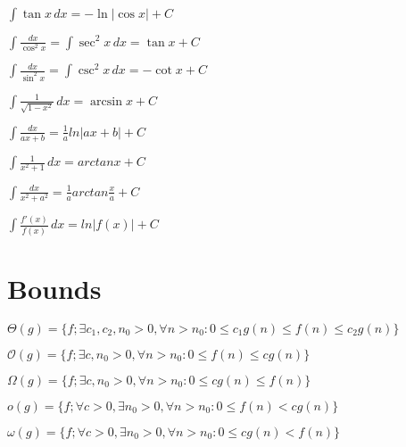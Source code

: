 \documentclass{article}
\begin{document}
\begin{multicols*}{2}
{\begin{center}
\begin{small}
\begin{compactenum}
\begin{math}
            \end{math}
            \item \begin{math}
                \int \tan{x} \, dx = -\ln{\left| \cos {x} \right|} + C
            \end{math}
            \item \begin{math}
                \int \frac{dx}{\cos^2 x}=\int \sec^2 x \, dx = \tan x + C
            \end{math}
            \item \begin{math}
                \int \frac{dx}{\sin^2 x}=\int \csc^2 x \, dx = -\cot x + C
            \end{math}
            \item \begin{math}
                \int {\frac{1}{\sqrt{1-x^2}}} \, dx = \arcsin {x} + C
            \end{math}
            \item \begin{math}
                \int \frac{dx}{ax + b} = \frac{1}{a} ln |ax + b| + C
            \end{math}
            \item \begin{math}
                \int \frac{1}{x^2 + 1} \, dx = arctan x + C
            \end{math}
            \item \begin{math}
                \int \frac{dx}{x^2 + a^2} = \frac{1}{a} arctan \frac{x}{a} + C
            \end{math}
            \item \begin{math}
                \int \frac{f'(x)}{f(x)} \, dx = ln|f(x)| + C
            \end{math}
        \end{compactenum}
    \end{small}
\end{center}

\section{Bounds}
\begin{compactitem}
    \item $\Theta(g) = \{f; \exists c_1,c_2,n_0>0, \forall n>n_0: 0 \leq c_1g(n)\leq f(n) \leq c_2g(n)\}$
	\item $\mathcal{O}(g) = \{f; \exists c,n_0>0, \forall n>n_0: 0 \leq f(n) \leq cg(n)\}$
	\item $\Omega(g) = \{f; \exists c,n_0>0, \forall n>n_0: 0 \leq cg(n) \leq f(n)\}$
	\item $o(g) = \{f;\forall c>0,\exists n_0>0,\forall n > n_0: 0 \leq f(n) < cg(n)\}$
	\item $\omega(g) = \{f;\forall c>0,\exists n_0>0,\forall n > n_0: 0 \leq cg(n) < f(n)\}$
\end{compactitem}


}
\end{multicols*}
\end{document}
